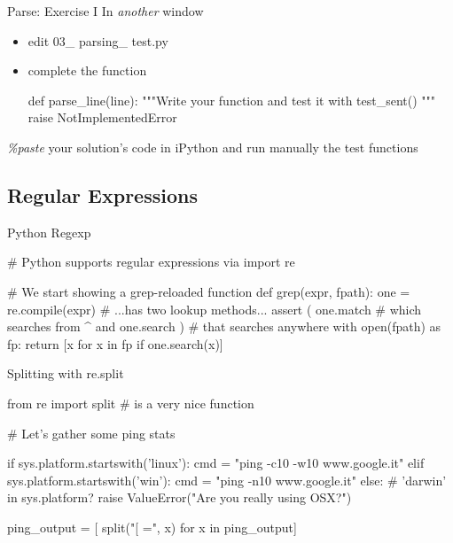 \begin{frame}[fragile]{Parse: Exercise I }
In \emph{another} window
\begin{itemize}
\item edit 03\_ parsing\_ test.py
\item complete the  function
\begin{pythoncode}
def parse_line(line):
    """Write your function and test it
        with test_sent()
    """
    raise NotImplementedError
\end{pythoncode}
\end{itemize}
\emph{\%paste} your solution's code in iPython and run manually
the test functions
\end{frame}



\subsection{Regular Expressions}

\begin{frame}[fragile]{Python Regexp}
\begin{pythoncode}
# Python supports regular expressions via
import re

# We start showing a grep-reloaded function
def grep(expr, fpath):
    one = re.compile(expr) 
    # ...has two lookup methods...
    assert ( one.match    # which searches from ^
         and one.search ) # that searches anywhere
    with open(fpath) as fp:
        return [x for x in fp if one.search(x)]

\end{pythoncode}
\end{frame}

\begin{frame}[fragile]{Splitting with re.split}
\begin{pythoncode}
from re import split # is a very nice function

# Let's gather some ping stats

if sys.platform.startswith('linux'):
    cmd = "ping -c10 -w10 www.google.it"
elif sys.platform.startswith('win'):
    cmd = "ping -n10 www.google.it"    
else: # 'darwin' in sys.platform?
    raise ValueError("Are you really using OSX?")
    
ping_output = [ split("[ =", x) for x in ping_output]

\end{pythoncode}
\end{frame}


